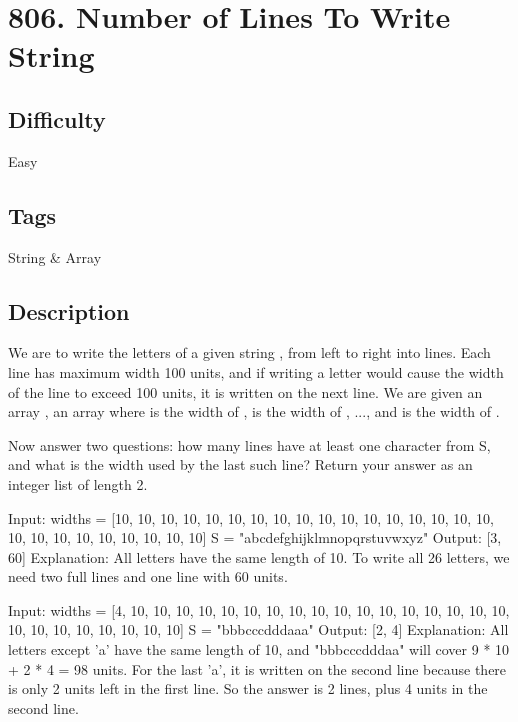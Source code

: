 \tocless\section{806. Number of Lines To Write String}
\label{algo:806}

\subsection*{Difficulty}
Easy

\subsection*{Tags}
String \& Array

\subsection*{Description}
We are to write the letters of a given string , from left to right into lines. Each line has maximum width 100 units, and if writing a letter would cause the width of the line to exceed 100 units, it is written on the next line. We are given an array , an array where  is the width of ,  is the width of , ..., and  is the width of .

Now answer two questions: how many lines have at least one character from S, and what is the width used by the last such line? Return your answer as an integer list of length 2.

\begin{example}
\begin{multilinecode}
Input:
widths = [10, 10, 10, 10, 10, 10, 10, 10, 10, 10, 10, 10, 10, 10, 10, 10, 10, 10, 10, 10, 10, 10, 10, 10, 10, 10]
S = "abcdefghijklmnopqrstuvwxyz"
Output: [3, 60]
Explanation:
All letters have the same length of 10. To write all 26 letters,
we need two full lines and one line with 60 units.
\end{multilinecode}
\end{example}

\begin{example}
\begin{multilinecode}
Input:
widths = [4, 10, 10, 10, 10, 10, 10, 10, 10, 10, 10, 10, 10, 10, 10, 10, 10, 10, 10, 10, 10, 10, 10, 10, 10, 10]
S = "bbbcccdddaaa"
Output: [2, 4]
Explanation:
All letters except 'a' have the same length of 10, and 
"bbbcccdddaa" will cover 9 * 10 + 2 * 4 = 98 units.
For the last 'a', it is written on the second line because
there is only 2 units left in the first line.
So the answer is 2 lines, plus 4 units in the second line.
\end{multilinecode}
\end{example}

